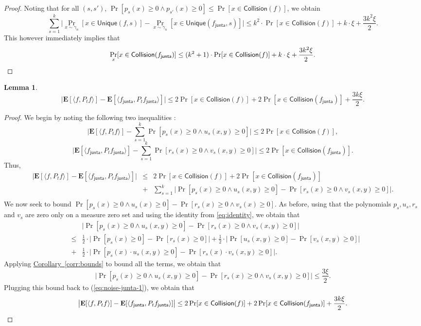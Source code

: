\documentclass[11pt]{article}
\numberwithin{equation}{section}
\newtheorem{lemma}[theorem]{Lemma}
\theoremstyle{definition}
\theoremstyle{plain}
\newcommand{\expref}[2]{\hyperref[#2]{#1~\ref{#2}}}
\newcommand{\fh}{{f_{\mathsf{junta}}}}
\begin{document}
\begin{proof}
Noting that for all $(s,s')$, $\Pr [p_s(x) \ge 0 \wedge p_{s'}(x) \ge 0] \le \Pr [x \in \mathsf{Collision}(f)]$, we obtain
\[
\sum_{s=1}^k \big|\Pr_{x \sim \gamma_n} [x \in \mathsf{Unique}(f,s)]- \Pr_{x \sim \gamma_n} [x \in \mathsf{Unique}(\fh,s)] \big| \le k^2 \cdot \Pr[x \in \mathsf{Collision}(f)] + k \cdot \xi + \frac{3k^2 \xi}{2}. 
\]
This however immediately implies that 
\[
\Pr_x [x \in \mathsf{Collision}(\fh)] \le  (k^2+1) \cdot \Pr[x \in \mathsf{Collision}(f)] + k \cdot \xi + \frac{3k^2 \xi}{2}. 
\qedhere
\]
\end{proof}

\begin{lemma}~\label{lem:noise-stab}
\[
\big| \mathbf{E}[\langle f, P_t f \rangle]  - \mathbf{E}[\langle \fh, P_t \fh \rangle]\big| \le 2\Pr[x \in \mathsf{Collision}(f)] +2 \Pr[x \in \mathsf{Collision}(\fh)] + \frac{3k\xi}{2}. 
\]
\end{lemma}
\begin{proof}
We begin by noting the following two inequalities :
\[
\big| \mathbf{E}[\langle f, P_t f \rangle]  -\sum_{s=1}^k \Pr[p_s(x) \ge 0 \wedge u_s(x,y) \ge 0] \big| \le 2 \Pr[x \in \mathsf{Collision}(f)],
\]
\[
\big| \mathbf{E}[\langle \fh, P_t \fh \rangle]  -\sum_{s=1}^k \Pr[r_s(x) \ge 0 \wedge v_s(x,y) \ge 0] \big| \le 2 \Pr[x \in \mathsf{Collision}(\fh)].
\]
Thus, 
\begin{eqnarray}
\big| \mathbf{E}[\langle f, P_t f \rangle] - \mathbf{E}[\langle \fh, P_t \fh \rangle] \big| &\le& 2\Pr[x \in \mathsf{Collision}(f)] +2 \Pr[x \in \mathsf{Collision}(\fh)] \nonumber \\ 
&+& \sum_{s=1}^k \big|\Pr[p_s(x) \ge 0 \wedge u_s(x,y) \ge 0]- \Pr[r_s(x) \ge 0 \wedge v_s(x,y) \ge 0] \big|. \nonumber \\ \label{eq:noise-junta-1}
\end{eqnarray}
We now seek to bound $\Pr[p_s(x) \ge 0 \wedge u_s(x) \ge 0]- \Pr[r_s(x) \ge 0 \wedge v_s(x) \ge 0]$. As before, using that the polynomials $p_s, u_s, r_s$ and $v_s$ are zero only
on a measure zero set and using the identity from \eqref{eq:identity}, we obtain that 
\begin{eqnarray*}
&& \big|\Pr[p_s(x) \ge 0 \wedge u_s(x,y) \ge 0]- \Pr[r_s(x) \ge 0 \wedge v_s(x,y) \ge 0] \big| \\ &\le& \frac{1}{2} \cdot  \big|\Pr[p_s(x) \ge 0]- \Pr[r_s(x) \ge 0] \big| +  \frac{1}{2} \cdot  \big|\Pr[u_s(x,y) \ge 0]- \Pr[v_s(x,y) \ge 0] \big|  \\ &+&  \frac{1}{2} \cdot  \big|\Pr[p_s(x) \cdot u_s(x,y) \ge 0]- \Pr[r_s(x) \cdot v_s(x,y) \ge 0] \big|.
\end{eqnarray*} 
Applying \expref{Corollary}{corr:bounds} to bound all the terms, we obtain that 
$$
 \big|\Pr[p_s(x) \ge 0 \wedge u_s(x,y) \ge 0]- \Pr[r_s(x) \ge 0 \wedge v_s(x,y) \ge 0] \big| \le \frac{3 \xi}{2}. 
$$
Plugging this bound back to (\ref{eq:noise-junta-1}), we obtain that 
\[
\big| \mathbf{E}[\langle f, P_t f \rangle] - \mathbf{E}[\langle \fh, P_t \fh \rangle] \big| \le   2\Pr[x \in \mathsf{Collision}(f)] +2 \Pr[x \in \mathsf{Collision}(\fh)] + \frac{3k\xi}{2}. 
\qedhere
\]
\end{proof}
\end{document}
